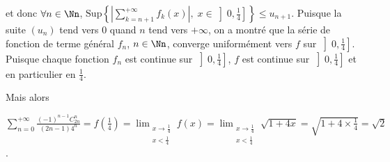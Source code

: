{{et donc $\forall n\in\Nn$, $\text{Sup}\left\{\left|\sum_{k=n+1}^{+\infty}f_k(x)\right|,\;x\in\left]0, \frac{1}{4}\right]\right\}\leqslant u_{n+1}$. Puisque la suite $(u_n)$ tend vers $0$ quand $n$ tend vers $+\infty$, on a montré que la série de fonction de terme général $f_n$, $n\in\Nn$, converge uniformément vers $f$ sur $\left]0, \frac{1}{4}\right]$. Puisque chaque fonction $f_n$ est continue sur $\left]0, \frac{1}{4}\right]$, $f$ est continue sur $\left]0, \frac{1}{4}\right]$ et en particulier en $ \frac{1}{4}$.

Mais alors

\begin{center}
$\sum_{n=0}^{+\infty} \frac{(-1)^{n-1}C_{2n}^n}{(2n-1)4^n}=f\left( \frac{1}{4}\right)=\displaystyle\lim_{\substack{x\rightarrow\frac{1}{4}\\
x<\frac{1}{4}}}f(x)=\displaystyle\lim_{\substack{x\rightarrow\frac{1}{4}\\
x<\frac{1}{4}}}\sqrt{1+4x}=\sqrt{1+4\times \frac{1}{4}}=\sqrt{2}$.
\end{center}

\begin{center}
\end{center}}
}